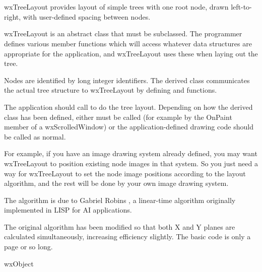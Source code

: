 \section{}\label{wxtreelayout}

wxTreeLayout provides layout of simple trees with one root node, drawn left-to-right,
with user-defined spacing between nodes.

wxTreeLayout is an abstract class that must be subclassed. The programmer
defines various member functions which will access whatever data structures
are appropriate for the application, and wxTreeLayout uses these when laying
out the tree.

Nodes are identified by long integer identifiers. The derived class
communicates the actual tree structure to wxTreeLayout by defining \rtfsp
and  functions.

The application should call  to do the tree
layout. Depending on how the derived class has been defined, either
\rtfsp{} must be called (for example by the OnPaint member
of a wxScrolledWindow) or the application-defined drawing code should be called
as normal.

For example, if you have an image drawing system already defined, you
may want wxTreeLayout to position existing node images in that system. So you
just need a way for wxTreeLayout to set the node image positions according to
the layout algorithm, and the rest will be done by your own image drawing
system.

The algorithm is due to Gabriel Robins \cite{robins87}, a linear-time
algorithm originally implemented in LISP for AI applications.

The original algorithm has been modified so that both X and Y planes
are calculated simultaneously, increasing efficiency slightly. The basic
code is only a page or so long.



wxObject

